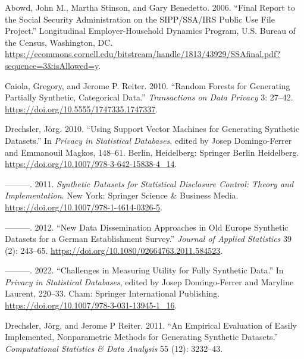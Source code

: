 \documentclass[
]{article}
\newlength{\cslhangindent}
\newlength{\cslentryspacingunit} %
\newenvironment{CSLReferences}[2] %
 {%
  \setlength{\parindent}{0pt}
  \ifodd #1
  \let\oldpar\par
  \def\par{\hangindent=\cslhangindent\oldpar}
  \fi
  \setlength{\parskip}{#2\cslentryspacingunit}
 }%
 {}
\begin{document}
\hypertarget{refs}{}
\begin{CSLReferences}{1}{0}
\leavevmode{}%
Abowd, John M., Martha Stinson, and Gary Benedetto. 2006. {``Final
Report to the Social Security Administration on the {SIPP/SSA/IRS}
Public Use File Project.''} Longitudinal Employer-Household Dynamics
Program, U.S. Bureau of the Census, Washington, DC.
\url{https://ecommons.cornell.edu/bitstream/handle/1813/43929/SSAfinal.pdf?sequence=3\&isAllowed=y}.

\leavevmode{}%
Caiola, Gregory, and Jerome P. Reiter. 2010. {``Random Forests for
Generating Partially Synthetic, Categorical Data.''} \emph{Transactions
on Data Privacy} 3: 27--42.
\url{https://doi.org/10.5555/1747335.1747337}.

\leavevmode{}%
Drechsler, Jörg. 2010. {``Using Support Vector Machines for Generating
Synthetic Datasets.''} In \emph{Privacy in Statistical Databases},
edited by Josep Domingo-Ferrer and Emmanouil Magkos, 148--61. Berlin,
Heidelberg: Springer Berlin Heidelberg.
\url{https://doi.org/10.1007/978-3-642-15838-4_14}.

\leavevmode{}%
---------. 2011. \emph{Synthetic Datasets for Statistical Disclosure
Control: Theory and Implementation}. New York: Springer Science \&
Business Media. \url{https://doi.org/10.1007/978-1-4614-0326-5}.

\leavevmode{}%
---------. 2012. {``New Data Dissemination Approaches in Old Europe
{\textendash} Synthetic Datasets for a German Establishment Survey.''}
\emph{Journal of Applied Statistics} 39 (2): 243--65.
\url{https://doi.org/10.1080/02664763.2011.584523}.

\leavevmode{}%
---------. 2022. {``Challenges in Measuring Utility for Fully Synthetic
Data.''} In \emph{Privacy in Statistical Databases}, edited by Josep
Domingo-Ferrer and Maryline Laurent, 220--33. Cham: Springer
International Publishing.
\url{https://doi.org/10.1007/978-3-031-13945-1_16}.

\leavevmode{}%
Drechsler, Jörg, and Jerome P Reiter. 2011. {``An Empirical Evaluation
of Easily Implemented, Nonparametric Methods for Generating Synthetic
Datasets.''} \emph{Computational Statistics \& Data Analysis} 55 (12):
3232--43.


\end{CSLReferences}
\end{document}
